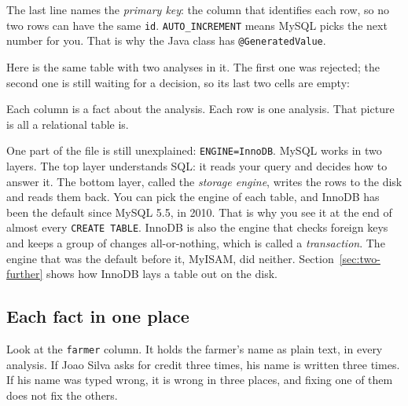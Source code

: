 The last line names the \emph{primary key}: the column that identifies each
row, so no two rows can have the same \texttt{id}. \texttt{AUTO\_INCREMENT}
means MySQL picks the next number for you. That is why the Java class has
\texttt{@GeneratedValue}.

Here is the same table with two analyses in it. The first one was rejected;
the second one is still waiting for a decision, so its last two cells are
empty:

\begin{center}
\end{center}

Each column is a fact about the analysis. Each row is one analysis. That
picture is all a relational table is.

One part of the file is still unexplained: \texttt{ENGINE=InnoDB}. MySQL
works in two layers. The top layer understands SQL: it reads your query and
decides how to answer it. The bottom layer, called the \emph{storage engine},
writes the rows to the disk and reads them back. You can pick the engine of
each table, and InnoDB has been the default since MySQL 5.5, in 2010. That
is why you see it at the end of almost every \texttt{CREATE TABLE}. InnoDB is
also the engine that checks foreign keys and keeps a group of changes
all-or-nothing, which is called a \emph{transaction}. The engine that was the
default before it, MyISAM, did neither. Section~\ref{sec:two-further} shows
how InnoDB lays a table out on the disk.

\subsection*{Each fact in one place}

Look at the \texttt{farmer} column. It holds the farmer's name as plain text,
in every analysis. If Joao Silva asks for credit three times, his name is
written three times. If his name was typed wrong, it is wrong in three
places, and fixing one of them does not fix the others.

